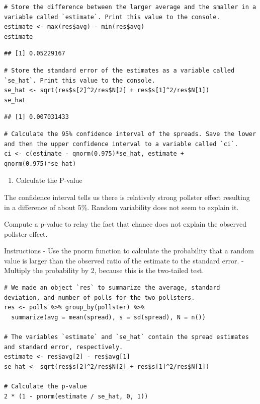 \documentclass[
]{article}
\providecommand{\tightlist}{%
  \setlength{\itemsep}{0pt}\setlength{\parskip}{0pt}}
\begin{document}
\begin{verbatim}
# Store the difference between the larger average and the smaller in a variable called `estimate`. Print this value to the console.
estimate <- max(res$avg) - min(res$avg)
estimate
\end{verbatim}

\begin{verbatim}
## [1] 0.05229167
\end{verbatim}

\begin{verbatim}
# Store the standard error of the estimates as a variable called `se_hat`. Print this value to the console.
se_hat <- sqrt(res$s[2]^2/res$N[2] + res$s[1]^2/res$N[1])
se_hat
\end{verbatim}

\begin{verbatim}
## [1] 0.007031433
\end{verbatim}

\begin{verbatim}
# Calculate the 95% confidence interval of the spreads. Save the lower and then the upper confidence interval to a variable called `ci`.
ci <- c(estimate - qnorm(0.975)*se_hat, estimate + qnorm(0.975)*se_hat)
\end{verbatim}

\begin{enumerate}
\def\labelenumi{\arabic{enumi}.}
\setcounter{enumi}{15}
\tightlist
\item
  Calculate the P-value
\end{enumerate}

The confidence interval tells us there is relatively strong pollster
effect resulting in a difference of about 5\%. Random variability does
not seem to explain it.

Compute a p-value to relay the fact that chance does not explain the
observed pollster effect.

Instructions - Use the pnorm function to calculate the probability that
a random value is larger than the observed ratio of the estimate to the
standard error. - Multiply the probability by 2, because this is the
two-tailed test.

\begin{verbatim}
# We made an object `res` to summarize the average, standard deviation, and number of polls for the two pollsters.
res <- polls %>% group_by(pollster) %>% 
  summarize(avg = mean(spread), s = sd(spread), N = n()) 

# The variables `estimate` and `se_hat` contain the spread estimates and standard error, respectively.
estimate <- res$avg[2] - res$avg[1]
se_hat <- sqrt(res$s[2]^2/res$N[2] + res$s[1]^2/res$N[1])

# Calculate the p-value
2 * (1 - pnorm(estimate / se_hat, 0, 1))
\end{verbatim}
\end{document}
